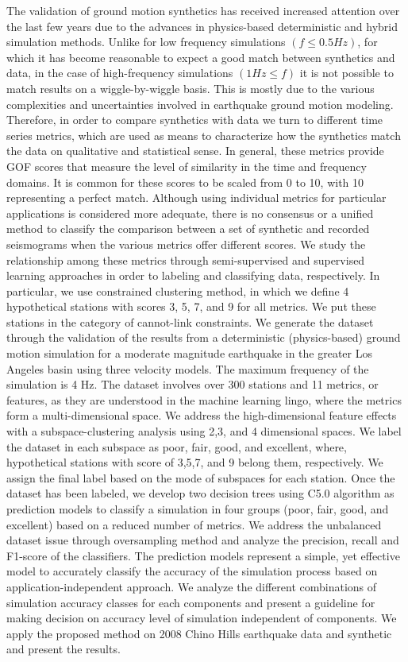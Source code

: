 % 
The validation of ground motion synthetics has received increased attention over the last few years due to the advances in physics-based deterministic and hybrid simulation methods. Unlike for low frequency simulations $(f \le 0.5 Hz)$, for which it has become reasonable to expect a good match between synthetics and data, in the case of high-frequency simulations $(1 Hz \le f)$ it is not possible to match results on a wiggle-by-wiggle basis. This is mostly due to the various complexities and uncertainties involved in earthquake ground motion modeling. Therefore, in order to compare synthetics with data we turn to different time series metrics, which are used as means to characterize how the synthetics match the data on qualitative and statistical sense. In general, these metrics provide GOF scores that measure the level of similarity in the time and frequency domains. It is common for these scores to be scaled from 0 to 10, with 10 representing a perfect match. Although using individual metrics for particular applications is considered more adequate, there is no consensus or a unified method to classify the comparison between a set of synthetic and recorded seismograms when the various metrics offer different scores. We study the relationship among these metrics through 
semi-supervised and supervised learning approaches in order to labeling and classifying data, respectively. In particular, we use constrained \kmeans{} clustering method, in which we define 4 hypothetical stations with scores 3, 5, 7, and 9 for all metrics. We put these stations in the category of cannot-link constraints. We generate the dataset through the validation of the results from a deterministic (physics-based) ground motion simulation for a moderate magnitude earthquake in the greater Los Angeles basin using three velocity models. The maximum frequency of the simulation is 4 Hz. The dataset involves over 300 stations and 11 metrics, or features, as they are understood in the machine learning lingo, where the metrics form a multi-dimensional space. We address the high-dimensional feature effects with a subspace-clustering analysis using 2,3, and 4 dimensional spaces. We label the dataset in each subspace as poor, fair, good, and excellent, where, hypothetical stations with score of 3,5,7, and 9 belong them, respectively. We assign the final label based on the mode of subspaces for each station.  Once the dataset has been labeled, we develop two decision trees using C5.0 algorithm as prediction models to classify a simulation in four groups (poor, fair, good, and excellent) based on a reduced number of metrics. We address the unbalanced dataset issue through oversampling method and analyze the precision, recall and F1-score of the classifiers. The prediction models represent a simple, yet effective model to accurately classify the accuracy of the simulation process based on application-independent approach. We analyze the different combinations of simulation accuracy classes for each components and present a guideline for making decision on accuracy level of simulation independent of components. We apply the proposed method on 2008 Chino Hills earthquake data and synthetic and present the results.







